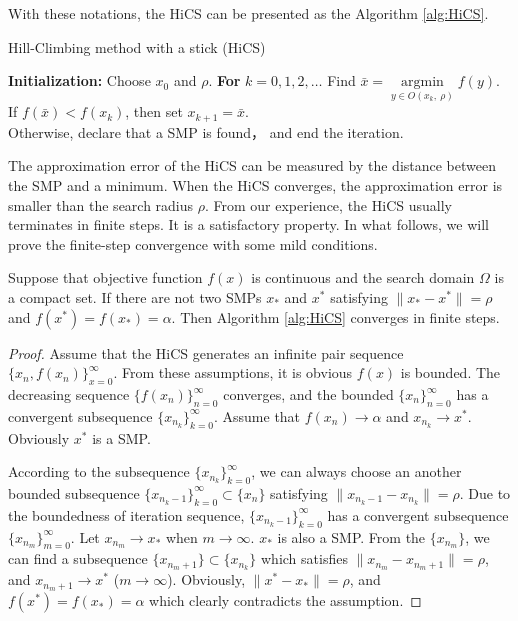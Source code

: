 \documentclass[mathpazo]{csam}
\DeclareMathOperator*{\argmin}{\mathrm{argmin}}
\theoremstyle{remark}
\begin{document}
With these notations, the HiCS can be presented
as the Algorithm \ref{alg:HiCS}.
\begin{algorithm}[H]
	\caption{Hill-Climbing method with a stick (HiCS)}
	\label{alg:HiCS}
\begin{algorithmic}[1]
	\STATE \textbf{Initialization:} Choose $x_0$ and $\rho$.
	\STATE \textbf{For} $k=0,1,2,\dots$
	\STATE \hspace{0.5cm} 
	Find $\bar{x}=\argmin\limits_{y\in O(x_k,~ \rho)} f(y)$.
			\\
	\STATE \hspace{0.5cm} If $f(\bar x)<f(x_k)$, then set $x_{k+1}= \bar{x}$.
		  \\
	\STATE \hspace{0.5cm} Otherwise, declare that 
		   a SMP is found， and end the iteration.
\end{algorithmic}
\end{algorithm}
The approximation error of the HiCS 
can be measured by the distance between the SMP and a minimum.
When the HiCS converges, the approximation error is smaller than the search radius
$\rho$.
From our experience, the HiCS usually terminates in finite steps. It is a satisfactory property. In what follows, we will
prove the finite-step convergence with some mild conditions.

\begin{theorem}
	\label{thm:fsc}
	Suppose that objective function $f(x)$ is continuous and the
	search domain $\Omega$ is a compact set.
	If there are not two SMPs $x_*$ and $x^*$ satisfying 
	$\|x_*-x^*\|=\rho$ and $f(x^*)=f(x_*)=\alpha$.
	Then Algorithm \ref{alg:HiCS} converges in finite steps.
\end{theorem}
\begin{proof}
	Assume that the HiCS generates an infinite pair sequence
	$\{x_n, f(x_n)\}_{x=0}^{\infty}$. From these assumptions,
	it is obvious $f(x)$ is bounded. The decreasing sequence
	$\{f(x_n)\}_{n=0}^\infty$ converges, and the bounded
	$\{x_n\}_{n=0}^\infty$ has a convergent subsequence 
	$\{x_{n_k}\}_{k=0}^\infty$. Assume that $f(x_n)\rightarrow
	\alpha$ and $x_{n_k}\rightarrow x^*$. Obviously $x^*$ is a SMP.
	
	According to the subsequence
	$\{x_{n_k}\}_{k=0}^\infty$, we can always choose an another
	bounded subsequence $\{x_{n_k -1}\}_{k=0}^\infty \subset
	\{x_n\}$ satisfying $\|x_{n_k - 1}-x_{n_k}\|=\rho$. 
	Due to the boundedness of iteration
	sequence, $\{x_{n_k-1}\}_{k=0}^\infty$ has a convergent
	subsequence $\{x_{n_{m}}\}_{m=0}^\infty$. Let $x_{n_m}
	\rightarrow x_*$ when $m\rightarrow \infty$. $x_*$ is also a SMP.
	From the $\{x_{n_m}\}$, we can find a subsequence
	$\{x_{n_{m}+1}\}\subset \{x_{n_k}\}$ which satisfies
	$\|x_{n_m}-x_{n_{m}+1}\|=\rho$, and $x_{n_{m}+1}\rightarrow x^*$
	($m\rightarrow \infty$).
	Obviously, $\|x^*-x_*\|=\rho$, and $f(x^*)=f(x_*)=\alpha$ 
	which clearly contradicts the assumption.
\end{proof}
\end{document}
